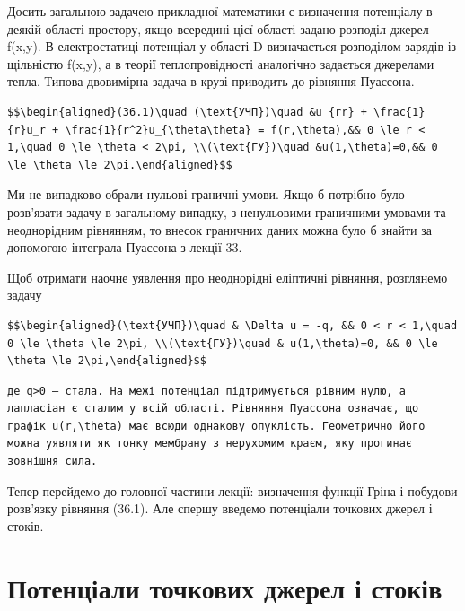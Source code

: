 \documentclass[
  ukrainian,
]{article}
\begin{document}
Досить загальною задачею прикладної математики є визначення потенціалу в
деякій області простору, якщо всередині цієї області задано розподіл
джерел f(x,y). В електростатиці потенціал у області D визначається
розподілом зарядів із щільністю f(x,y), а в теорії теплопровідності
аналогічно задається джерелами тепла. Типова двовимірна задача в крузі
приводить до рівняння Пуассона.

\begin{verbatim}
$$\begin{aligned}(36.1)\quad (\text{УЧП})\quad &u_{rr} + \frac{1}{r}u_r + \frac{1}{r^2}u_{\theta\theta} = f(r,\theta),&& 0 \le r < 1,\quad 0 \le \theta < 2\pi, \\(\text{ГУ})\quad &u(1,\theta)=0,&& 0 \le \theta \le 2\pi.\end{aligned}$$
\end{verbatim}

Ми не випадково обрали нульові граничні умови. Якщо б потрібно було
розв'язати задачу в загальному випадку, з ненульовими граничними умовами
та неоднорідним рівнянням, то внесок граничних даних можна було б знайти
за допомогою інтеграла Пуассона з лекції 33.

Щоб отримати наочне уявлення про неоднорідні еліптичні рівняння,
розглянемо задачу

\begin{verbatim}
$$\begin{aligned}(\text{УЧП})\quad & \Delta u = -q, && 0 < r < 1,\quad 0 \le \theta \le 2\pi, \\(\text{ГУ})\quad & u(1,\theta)=0, && 0 \le \theta \le 2\pi,\end{aligned}$$
\end{verbatim}

\begin{verbatim}
де q>0 — стала. На межі потенціал підтримується рівним нулю, а лапласіан є сталим у всій області. Рівняння Пуассона означає, що графік u(r,\theta) має всюди однакову опуклість. Геометрично його можна уявляти як тонку мембрану з нерухомим краєм, яку прогинає зовнішня сила.
\end{verbatim}

Тепер перейдемо до головної частини лекції: визначення функції Гріна і
побудови розв'язку рівняння (36.1). Але спершу введемо потенціали
точкових джерел і стоків.

\section{Потенціали точкових джерел і
стоків}\label{ux43fux43eux442ux435ux43dux446ux456ux430ux43bux438-ux442ux43eux447ux43aux43eux432ux438ux445-ux434ux436ux435ux440ux435ux43b-ux456-ux441ux442ux43eux43aux456ux432}
\end{document}

